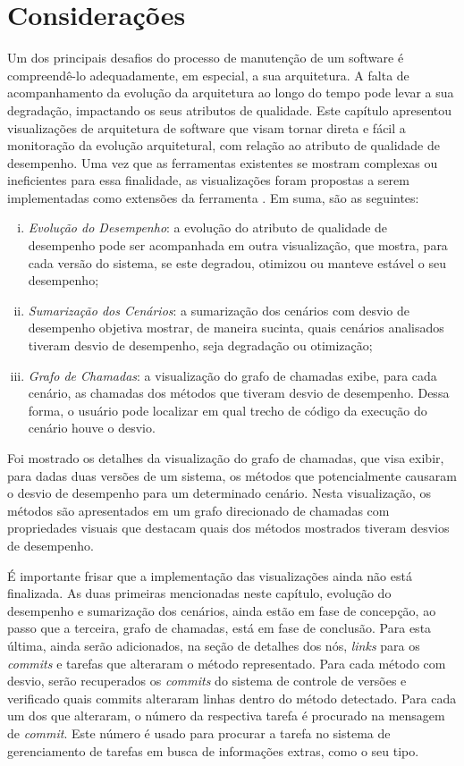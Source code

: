 \section{Considerações} \label{sec:consideracoes-cap3}

Um dos principais desafios do processo de manutenção de um software é compreendê-lo adequadamente, em especial, a sua arquitetura. A falta de acompanhamento da evolução da arquitetura ao longo do tempo pode levar a sua degradação, impactando os seus atributos de qualidade. Este capítulo apresentou visualizações de arquitetura de software que visam tornar direta e fácil a monitoração da evolução arquitetural, com relação ao atributo de qualidade de desempenho. Uma vez que as ferramentas existentes se mostram complexas ou ineficientes para essa finalidade, as visualizações foram propostas a serem implementadas como extensões da ferramenta \textit{\perfMinerName}. Em suma, são as seguintes:
\begin{enumerate}[(i)]
   \item \textit{Evolução do Desempenho}: a evolução do atributo de qualidade de desempenho pode ser acompanhada em outra visualização, que mostra, para cada versão do sistema, se este degradou, otimizou ou manteve estável o seu desempenho;
   \item \textit{Sumarização dos Cenários}: a sumarização dos cenários com desvio de desempenho objetiva mostrar, de maneira sucinta, quais cenários analisados tiveram desvio de desempenho, seja degradação ou otimização;
   \item \textit{Grafo de Chamadas}: a visualização do grafo de chamadas exibe, para cada cenário, as chamadas dos métodos que tiveram desvio de desempenho. Dessa forma, o usuário pode localizar em qual trecho de código da execução do cenário houve o desvio.
\end{enumerate}

Foi mostrado os detalhes da visualização do grafo de chamadas, que visa exibir, para dadas duas versões de um sistema, os métodos que potencialmente causaram o desvio de desempenho para um determinado cenário. Nesta visualização, os métodos são apresentados em um grafo direcionado de chamadas com propriedades visuais que destacam quais dos métodos mostrados tiveram desvios de desempenho.

É importante frisar que a implementação das visualizações ainda não está finalizada. As duas primeiras mencionadas neste capítulo, evolução do desempenho e sumarização dos cenários, ainda estão em fase de concepção, ao passo que a terceira, grafo de chamadas, está em fase de conclusão. Para esta última, ainda serão adicionados, na seção de detalhes dos nós, \textit{links} para os \textit{commits} e tarefas que alteraram o método representado. Para cada método com desvio, serão recuperados os \textit{commits} do sistema de controle de versões e verificado quais commits alteraram linhas dentro do método detectado. Para cada um dos que alteraram, o número da respectiva tarefa é procurado na mensagem de \textit{commit}. Este número é usado para procurar a tarefa no sistema de gerenciamento de tarefas em busca de informações extras, como o seu tipo.